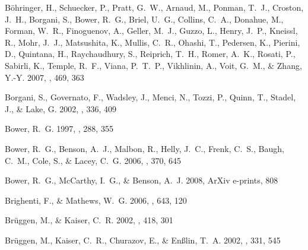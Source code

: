 \documentclass[12pt,preprint]{aastex}
\begin{document}
\begin{thebibliography}{137}
{B{\"o}hringer}, H., {Schuecker}, P., {Pratt}, G.~W., {Arnaud}, M., {Ponman},
  T.~J., {Croston}, J.~H., {Borgani}, S., {Bower}, R.~G., {Briel}, U.~G.,
  {Collins}, C.~A., {Donahue}, M., {Forman}, W.~R., {Finoguenov}, A., {Geller},
  M.~J., {Guzzo}, L., {Henry}, J.~P., {Kneissl}, R., {Mohr}, J.~J.,
  {Matsushita}, K., {Mullis}, C.~R., {Ohashi}, T., {Pedersen}, K., {Pierini},
  D., {Quintana}, H., {Raychaudhury}, S., {Reiprich}, T.~H., {Romer}, A.~K.,
  {Rosati}, P., {Sabirli}, K., {Temple}, R.~F., {Viana}, P.~T.~P., {Vikhlinin},
  A., {Voit}, G.~M., \& {Zhang}, Y.-Y. 2007, \aap, 469, 363

{Borgani}, S., {Governato}, F., {Wadsley}, J., {Menci}, N., {Tozzi}, P.,
  {Quinn}, T., {Stadel}, J., \& {Lake}, G. 2002, \mnras, 336, 409

{Bower}, R.~G. 1997, \mnras, 288, 355

{Bower}, R.~G., {Benson}, A.~J., {Malbon}, R., {Helly}, J.~C., {Frenk}, C.~S.,
  {Baugh}, C.~M., {Cole}, S., \& {Lacey}, C.~G. 2006, \mnras, 370, 645

{Bower}, R.~G., {McCarthy}, I.~G., \& {Benson}, A.~J. 2008, ArXiv e-prints, 808

{Brighenti}, F., \& {Mathews}, W.~G. 2006, \apj, 643, 120

{Br{\"u}ggen}, M., \& {Kaiser}, C.~R. 2002, \nat, 418, 301

{Br{\"u}ggen}, M., {Kaiser}, C.~R., {Churazov}, E., \& {En{\ss}lin}, T.~A.
  2002, \mnras, 331, 545


\end{thebibliography}
\end{document}
